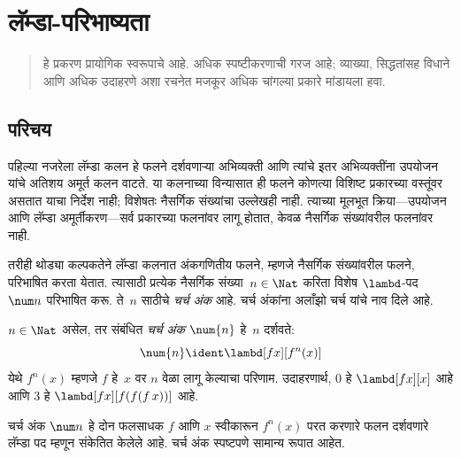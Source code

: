 \chapter{लॅम्डा-परिभाष्यता}\label{lam:rep:chap}
\begin{quote}
हे प्रकरण प्रायोगिक स्वरूपाचे आहे. अधिक स्पष्टीकरणाची
  गरज आहे; व्याख्या, सिद्धतांसह विधाने आणि अधिक
  उदाहरणे अशा रचनेत मजकूर अधिक चांगल्या प्रकारे
  मांडायला हवा.
\end{quote}








\section{परिचय}\label{lam:ldf:int:sec}

पहिल्या नजरेला लॅम्डा कलन हे फलने दर्शवणाऱ्या
अभिव्यक्ती आणि त्यांचे इतर अभिव्यक्तींना उपयोजन
यांचे अतिशय अमूर्त कलन वाटते. या कलनाच्या
विन्यासात ही फलने कोणत्या विशिष्ट प्रकारच्या वस्तूंवर
असतात याचा निर्देश नाही; विशेषतः नैसर्गिक संख्यांचा
उल्लेखही नाही. त्याच्या मूलभूत क्रिया—उपयोजन आणि
लॅम्डा अमूर्तीकरण—सर्व प्रकारच्या फलनांवर लागू
होतात, केवळ नैसर्गिक संख्यांवरील फलनांवर नाही.

तरीही थोड्या कल्पकतेने लॅम्डा कलनात अंकगणितीय
फलने, म्हणजे नैसर्गिक संख्यांवरील फलने, परिभाषित
करता येतात. त्यासाठी प्रत्येक नैसर्गिक संख्या~$n \in
\Nat$ करिता विशेष $\lambd$-पद~$\num n$ परिभाषित
करू. ते~$n$ साठीचे \emph{चर्च अंक} आहे. चर्च अंकांना
अलाँझो चर्च यांचे नाव दिले आहे.

\begin{defn}
  $n \in \Nat$ असेल, तर संबंधित \emph{चर्च अंक}
  $\num{n}$ हे~$n$ दर्शवते:
  \[    \num{n} \ident \lambd[fx][f^n(x)]
  \]
  येथे $f^n(x)$ म्हणजे $f$ हे~$x$ वर $n$ वेळा लागू
  केल्याचा परिणाम. उदाहरणार्थ, $\num{0}$ हे
  $\lambd[fx][x]$ आहे आणि $\num{3}$ हे
  $\lambd[fx][f(f(f\,x))]$ आहे.
\end{defn}

चर्च अंक $\num n$ हे दोन फलसाधक $f$ आणि $x$
स्वीकारून $f^n(x)$ परत करणारे फलन दर्शवणारे लॅम्डा
पद म्हणून संकेतित केलेले आहे. चर्च अंक स्पष्टपणे
सामान्य रूपात आहेत.

